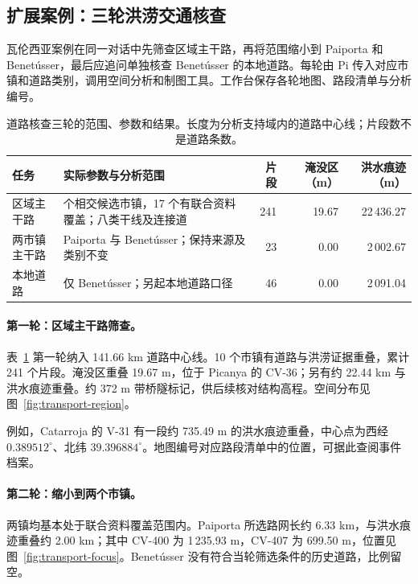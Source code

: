 \subsection{扩展案例：三轮洪涝交通核查}
瓦伦西亚案例在同一对话中先筛查区域主干路，再将范围缩小到 Paiporta 和 Benetússer，最后应追问单独核查 Benetússer 的本地道路。每轮由 Pi 传入对应市镇和道路类别，调用空间分析和制图工具。工作台保存各轮地图、路段清单与分析编号。

\begin{table}[H]
\centering
\caption{道路核查三轮的范围、参数和结果。长度为分析支持域内的道路中心线；片段数不是道路条数。}
\label{tab:transport-turns}
\small
\begin{tabularx}{\linewidth}{@{}p{25mm}>{\raggedright\arraybackslash}X r r r@{}}
\toprule
任务 & 实际参数与分析范围 & 片段 & 淹没区（m） & 洪水痕迹（m）\\
\midrule
区域主干路 & 18 个相交候选市镇，17 个有联合资料覆盖；八类干线及连接道 &241&19.67&22\,436.27\\
两市镇主干路 & Paiporta 与 Benetússer；保持来源及类别不变 &23&0.00&2\,002.67\\
本地道路 & 仅 Benetússer；另起本地道路口径 &46&0.00&2\,091.04\\
\bottomrule
\end{tabularx}
\end{table}

\paragraph{第一轮：区域主干路筛查。}
表~\ref{tab:transport-turns} 第一轮纳入 141.66 km 道路中心线。10 个市镇有道路与洪涝证据重叠，累计 241 个片段。淹没区重叠 19.67 m，位于 Picanya 的 CV-36；另有约 22.44 km 与洪水痕迹重叠。约 372 m 带桥隧标记，供后续核对结构高程。空间分布见图~\ref{fig:transport-region}。

例如，Catarroja 的 V-31 有一段约 735.49 m 的洪水痕迹重叠，中心点为西经 $0.389512^\circ$、北纬 $39.396884^\circ$。地图编号对应路段清单中的位置，可据此查阅事件档案。

\paragraph{第二轮：缩小到两个市镇。}
两镇均基本处于联合资料覆盖范围内。Paiporta 所选路网长约 6.33 km，与洪水痕迹重叠约 2.00 km；其中 CV-400 为 1\,235.93 m，CV-407 为 699.50 m，位置见图~\ref{fig:transport-focus}。Benetússer 没有符合当轮筛选条件的历史道路，比例留空。

